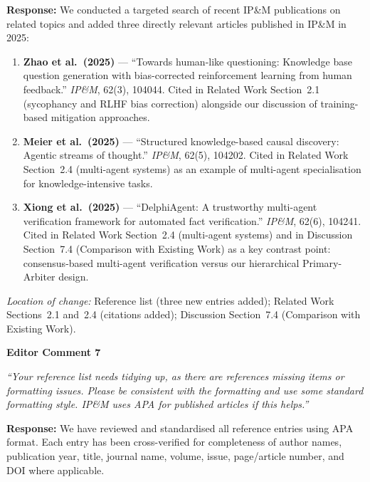 \documentclass[12pt,a4paper]{article}
\begin{document}
\textbf{Response:} We conducted a targeted search of recent IP\&M publications on related topics and added three directly relevant articles published in IP\&M in 2025:

\begin{enumerate}[nosep]
  \item \textbf{Zhao et al.\ (2025)} --- ``Towards human-like questioning: Knowledge base question generation with bias-corrected reinforcement learning from human feedback.'' \textit{IP\&M}, 62(3), 104044. Cited in Related Work Section~2.1 (sycophancy and RLHF bias correction) alongside our discussion of training-based mitigation approaches.

  \item \textbf{Meier et al.\ (2025)} --- ``Structured knowledge-based causal discovery: Agentic streams of thought.'' \textit{IP\&M}, 62(5), 104202. Cited in Related Work Section~2.4 (multi-agent systems) as an example of multi-agent specialisation for knowledge-intensive tasks.

  \item \textbf{Xiong et al.\ (2025)} --- ``DelphiAgent: A trustworthy multi-agent verification framework for automated fact verification.'' \textit{IP\&M}, 62(6), 104241. Cited in Related Work Section~2.4 (multi-agent systems) and in Discussion Section~7.4 (Comparison with Existing Work) as a key contrast point: consensus-based multi-agent verification versus our hierarchical Primary-Arbiter design.
\end{enumerate}

\textit{Location of change:} Reference list (three new entries added); Related Work Sections~2.1 and~2.4 (citations added); Discussion Section~7.4 (Comparison with Existing Work).

\vspace{0.5cm}


\noindent \textbf{Editor Comment 7}

\begin{editorbox}
\textit{``Your reference list needs tidying up, as there are references missing items or formatting issues. Please be consistent with the formatting and use some standard formatting style. IP\&M uses APA for published articles if this helps.''}
\end{editorbox}

\textbf{Response:} We have reviewed and standardised all reference entries using APA format. Each entry has been cross-verified for completeness of author names, publication year, title, journal name, volume, issue, page/article number, and DOI where applicable.
\end{document}
